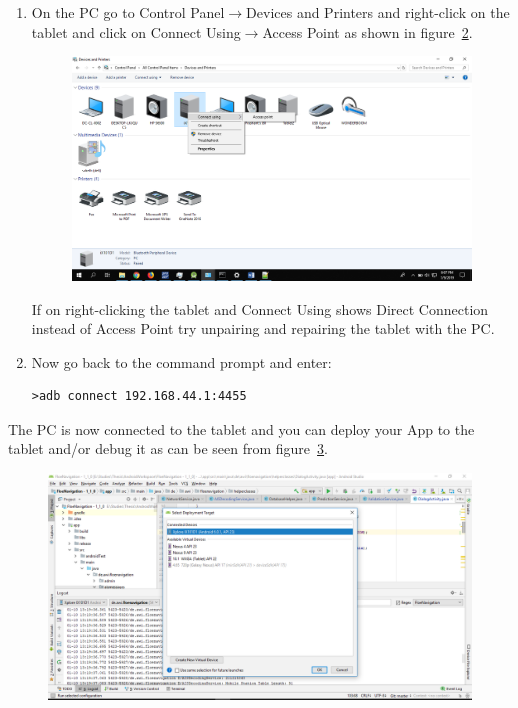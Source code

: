 \begin{enumerate}
\begin{figure}[h]
			\label{fig:CH6enableBluetoothTethering}
		\end{figure}
%
	\item On the PC go to Control Panel$\to$Devices and Printers and right-click on the tablet and click on Connect Using$\to$Access Point as shown in figure~\ref{fig:CH6connectAccessPoint}. 
		\begin{figure}[h]
			\centering
			\includegraphics[height=0.3\textheight]{fig06/connectAccessPoint.png}
			\label{fig:CH6connectAccessPoint}
		\end{figure}
\newline
\noindent
If on right-clicking the tablet and Connect Using shows Direct Connection instead of Access Point try unpairing and repairing the tablet with the PC.
%
	\item Now go back to the command prompt and enter:
		\begin{lstlisting}[style=DOS]
			>adb connect 192.168.44.1:4455
		\end{lstlisting} 	
\end{enumerate}
The PC is now connected to the tablet and you can deploy your App to the tablet and/or debug it as can be seen from figure~\ref{fig:CH6DeploymentOverBluetooth}.
\begin{figure}[h]
	\centering
	\includegraphics[height=0.3\textheight]{fig06/DeploymentOverBluetooth.png}
	\label{fig:CH6DeploymentOverBluetooth}
\end{figure}
